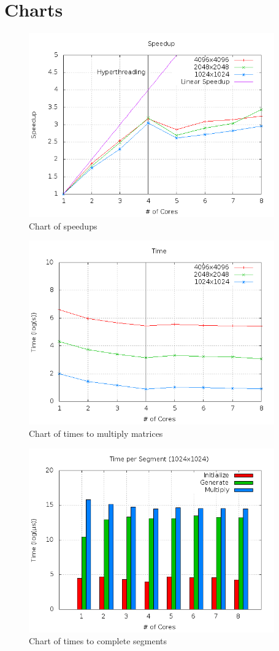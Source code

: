 \documentclass[11pt]{article}
\begin{document}
\section{Charts}
\begin{figure}
\centering
\includegraphics[width=300pt]{speedup.png}
\caption{Chart of speedups}
\end{figure}
\begin{figure}
\centering
\includegraphics[width=300pt]{time.png}
\caption{Chart of times to multiply matrices}
\end{figure}
\begin{figure}
\centering
\includegraphics[width=300pt]{segment.png}
\caption{Chart of times to complete segments}
\end{figure}
\end{document}
